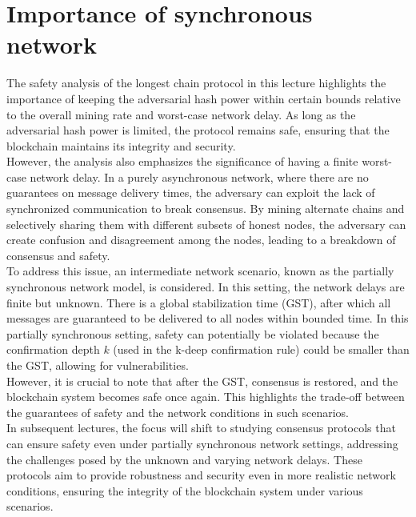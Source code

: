 \documentclass{report}
\begin{document}
\section{Importance of synchronous network}
The safety analysis of the longest chain protocol in this lecture highlights the importance of keeping the adversarial hash power within certain bounds relative to the overall mining rate and worst-case network delay. As long as the adversarial hash power is limited, the protocol remains safe, ensuring that the blockchain maintains its integrity and security.\\
However, the analysis also emphasizes the significance of having a finite worst-case network delay. In a purely asynchronous network, where there are no guarantees on message delivery times, the adversary can exploit the lack of synchronized communication to break consensus. By mining alternate chains and selectively sharing them with different subsets of honest nodes, the adversary can create confusion and disagreement among the nodes, leading to a breakdown of consensus and safety.\\
To address this issue, an intermediate network scenario, known as the partially synchronous network model, is considered. In this setting, the network delays are finite but unknown. There is a global stabilization time (GST), after which all messages are guaranteed to be delivered to all nodes within bounded time. In this partially synchronous setting, safety can potentially be violated because the confirmation depth $k$ (used in the k-deep confirmation rule) could be smaller than the GST, allowing for vulnerabilities.\\
However, it is crucial to note that after the GST, consensus is restored, and the blockchain system becomes safe once again. This highlights the trade-off between the guarantees of safety and the network conditions in such scenarios.\\
In subsequent lectures, the focus will shift to studying consensus protocols that can ensure safety even under partially synchronous network settings, addressing the challenges posed by the unknown and varying network delays. These protocols aim to provide robustness and security even in more realistic network conditions, ensuring the integrity of the blockchain system under various scenarios.
\end{document}
